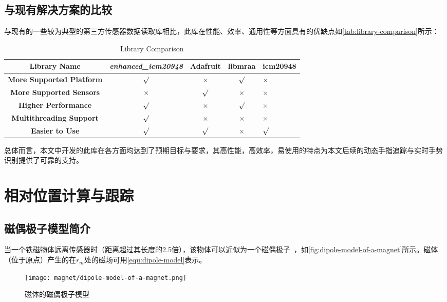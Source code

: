 \subsection{与现有解决方案的比较}
与现有的一些较为典型的第三方传感器数据读取库相比，此库在性能、效率、通用性等方面具有的优缺点如\autoref{tab:library-comparison}所示：
\begin{table}[ht]
    \caption{\label{tab:library-comparison}Library Comparison}
    \begin{tabularx}{\linewidth}{c|c|c|c|X<{\centering}|}
        \hline
        {\bfseries Library Name} & {\bfseries \itshape enhanced\_icm20948} & Adafruit & libmraa & icm20948\\ \hline
        {\bfseries More Supported Platform} & {$\surd$} & {$\times$} & {$\surd$} & {$\times$} \\ \hline
        {\bfseries More Supported Sensors} & {$\times$} & {$\surd$} & {$\times$} & {$\times$} \\ \hline
        {\bfseries Higher Performance} & {$\surd$} & {$\times$} & {$\surd$} & {$\times$} \\ \hline
        {\bfseries Multithreading Support} & {$\surd$} & {$\times$} & {$\times$} & {$\times$} \\ \hline
        {\bfseries Easier to Use} & {$\surd$} & {$\surd$} & {$\times$} & {$\surd$} \\ \hline
    \end{tabularx}
\end{table}

总体而言，本文中开发的此库在各方面均达到了预期目标与要求，其高性能，高效率，易使用的特点为本文后续的动态手指追踪与实时手势识别提供了可靠的支持。

\cleardoublepage
\section{相对位置计算与跟踪}
\subsection{磁偶极子模型简介}
当一个铁磁物体远离传感器时（距离超过其长度的2.5倍），该物体可以近似为一个磁偶极子~\cite{mainArticle3}，如\autoref{fig:dipole-model-of-a-magnet}所示。磁体（位于原点）产生的在$r_m$处的磁场可用\autoref{equ:dipole-model}表示。

\begin{figure}[H]
    \centering
    \texttt{[image: magnet/dipole-model-of-a-magnet.png]}
    \caption{\label{fig:dipole-model-of-a-magnet}磁体的磁偶极子模型}
\end{figure}


